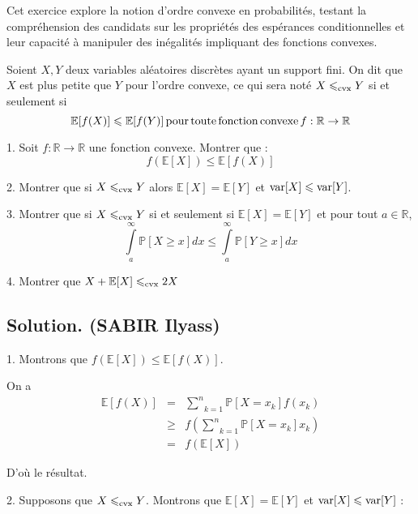 Cet exercice explore la notion d'ordre convexe en probabilit{\'e}s, testant la
compr{\'e}hension des candidats sur les propri{\'e}t{\'e}s des esp{\'e}rances
conditionnelles et leur capacit{\'e} {\`a} manipuler des in{\'e}galit{\'e}s
impliquant des fonctions convexes.
\begin{exercise}[]
Soient $X, Y$ deux variables al{\'e}atoires discr{\`e}tes ayant un support
fini. On dit que $X$ est plus petite que $Y$ pour l'ordre convexe, ce qui sera
not{\'e} $X \leqslant_{\operatorname{cvx}} Y$ si et seulement si
\[ \mathbb{E} [f (X)] \leqslant \mathbb{E} [f (Y)] \operatorname{pour} \operatorname{toute}
   \operatorname{fonction} \operatorname{convexe} f : \mathbb{R} \rightarrow \mathbb{R} \]


1. Soit $f : \mathbb{R} \rightarrow \mathbb{R}$ une fonction convexe. Montrer
que :
\[ f (\mathbb{E} [X]) \leqslant \mathbb{E} [f (X)] \]


2. Montrer que si $X \leqslant_{\operatorname{cvx}} Y$ alors $\mathbb{E} [X]
=\mathbb{E} [Y]$ et $\operatorname{var} [X] \leqslant \operatorname{var} [Y]$.

3. Montrer que si $X \leqslant_{\operatorname{cvx}} Y$ si et seulement si $\mathbb{E}
[X] =\mathbb{E} [Y]$ et pour tout $a \in \mathbb{R}$,
\[ \underset{a}{\overset{\infty}{\int}} \mathbb{P} [X \geqslant x] d x
   \leqslant \underset{a}{\overset{\infty}{\int}} \mathbb{P} [Y \geqslant x] d
   x \]


4. Montrer que $X +\mathbb{E} [X] \leqslant_{\operatorname{cvx}} 2 X$

\end{exercise}

\subsection*{Solution. (SABIR Ilyass)}


1. Montrons que $f (\mathbb{E} [X]) \leqslant \mathbb{E} [f (X)]$.

On a
\begin{eqnarray*}
  \mathbb{E} [f (X)] & = & \underset{k = 1}{\overset{n}{\sum}} \mathbb{P} [X =
  x_k] f (x_k)\\
  & \geqslant & f \left( \underset{k = 1}{\overset{n}{\sum}} \mathbb{P} [X =
  x_k] x_k \right)\\
  & = & f (\mathbb{E} [X])
\end{eqnarray*}


D'o{\`u} le r{\'e}sultat.

2. Supposons que $X \leqslant_{\operatorname{cvx}} Y$. Montrons que $\mathbb{E} [X]
=\mathbb{E} [Y]$ et $\operatorname{var} [X] \leqslant \operatorname{var} [Y]$ :


